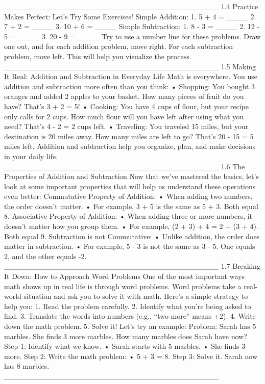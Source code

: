 ________________________________________
1.4 Practice Makes Perfect: Let’s Try Some Exercises!
Simple Addition:
1.	5 + 4 = ____
2.	7 + 2 = ____
3.	10 + 6 = ____
Simple Subtraction:
1.	8 - 3 = ____
2.	12 - 5 = ____
3.	20 - 9 = ____
Try to use a number line for these problems. Draw one out, and for each addition problem, move right. For each subtraction problem, move left. This will help you visualize the process.
________________________________________
1.5 Making It Real: Addition and Subtraction in Everyday Life
Math is everywhere. You use addition and subtraction more often than you think:
•	Shopping: You bought 3 oranges and added 2 apples to your basket. How many pieces of fruit do you have? That’s 3 + 2 = 5!
•	Cooking: You have 4 cups of flour, but your recipe only calls for 2 cups. How much flour will you have left after using what you need? That’s 4 - 2 = 2 cups left.
•	Traveling: You traveled 15 miles, but your destination is 20 miles away. How many miles are left to go? That’s 20 - 15 = 5 miles left.
Addition and subtraction help you organize, plan, and make decisions in your daily life.
________________________________________
1.6 The Properties of Addition and Subtraction
Now that we’ve mastered the basics, let’s look at some important properties that will help us understand these operations even better:
Commutative Property of Addition:
•	When adding two numbers, the order doesn’t matter.
•	For example, 3 + 5 is the same as 5 + 3. Both equal 8.
Associative Property of Addition:
•	When adding three or more numbers, it doesn’t matter how you group them.
•	For example, (2 + 3) + 4 = 2 + (3 + 4). Both equal 9.
Subtraction is not Commutative:
•	Unlike addition, the order does matter in subtraction.
•	For example, 5 - 3 is not the same as 3 - 5. One equals 2, and the other equals -2.
________________________________________
1.7 Breaking It Down: How to Approach Word Problems
One of the most important ways math shows up in real life is through word problems. Word problems take a real-world situation and ask you to solve it with math.
Here’s a simple strategy to help you:
1.	Read the problem carefully.
2.	Identify what you’re being asked to find.
3.	Translate the words into numbers (e.g., “two more” means +2).
4.	Write down the math problem.
5.	Solve it!
Let’s try an example:
Problem: Sarah has 5 marbles. She finds 3 more marbles. How many marbles does Sarah have now?
Step 1: Identify what we know.
•	Sarah starts with 5 marbles.
•	She finds 3 more.
Step 2: Write the math problem:
•	5 + 3 = 8.
Step 3: Solve it. Sarah now has 8 marbles.
________________________________________
